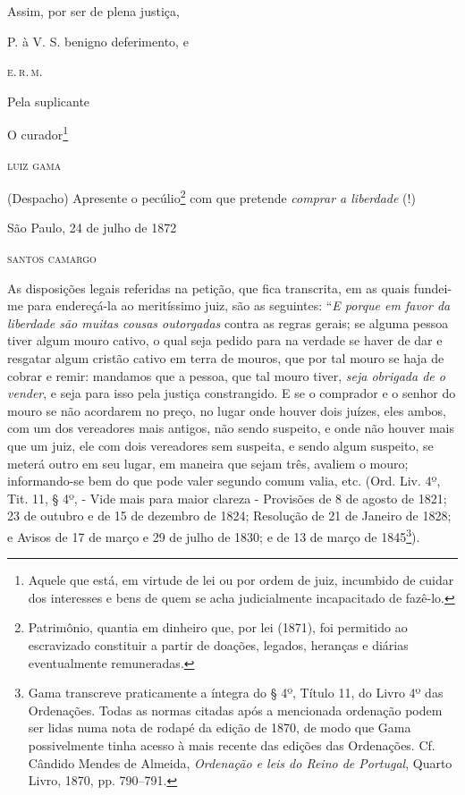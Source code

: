 Assim, por ser de plena justiça,

P. à V. S. benigno deferimento, e

\begin{flushright}
\textsc{e.\,r.\,m.}

Pela suplicante

O curador\footnote{ Aquele que está, em virtude de lei ou por ordem de
  juiz, incumbido de cuidar dos interesses e bens de quem se acha
  judicialmente incapacitado de fazê-lo.}

\textsc{luiz gama}
\end{flushright}

(Despacho) Apresente o pecúlio\footnote{ Patrimônio, quantia em
  dinheiro que, por lei (1871), foi permitido ao escravizado constituir
  a partir de doações, legados, heranças e diárias eventualmente
  remuneradas.} com que pretende \emph{comprar a liberdade} (!)

\begin{flushright}
São Paulo, 24 de julho de 1872

\textsc{santos camargo}
\end{flushright}

As disposições legais referidas na petição, que fica transcrita, em as
quais fundei-me para endereçá-la ao meritíssimo juiz, são as seguintes:
``\emph{E porque em favor da liberdade são muitas cousas outorgadas}
contra as regras gerais; se alguma pessoa tiver algum mouro cativo, o
qual seja pedido para na verdade se haver de dar e resgatar algum
cristão cativo em terra de mouros, que por tal mouro se haja de cobrar e
remir: mandamos que a pessoa, que tal mouro tiver, \emph{seja obrigada
de o vender}, e seja para isso pela justiça constrangido. E se o
comprador e o senhor do mouro se não acordarem no preço, no lugar onde
houver dois juízes, eles ambos, com um dos vereadores mais antigos, não
sendo suspeito, e onde não houver mais que um juiz, ele com dois
vereadores sem suspeita, e sendo algum suspeito, se meterá outro em seu
lugar, em maneira que sejam três, avaliem o mouro; informando-se bem do
que pode valer segundo comum valia, etc. (Ord. Liv. 4º, Tit. 11, § 4º, -
Vide mais para maior clareza - Provisões de 8 de agosto de 1821; 23 de
outubro e de 15 de dezembro de 1824; Resolução de 21 de Janeiro de 1828;
e Avisos de 17 de março e 29 de julho de 1830; e de 13 de março de
1845\footnote{ Gama transcreve praticamente a íntegra do § 4º, Título
  11, do Livro 4º das Ordenações. Todas as normas citadas após a
  mencionada ordenação podem ser lidas numa nota de rodapé da edição de
  1870, de modo que Gama possivelmente tinha acesso à mais recente das
  edições das Ordenações. Cf. Cândido Mendes de Almeida, \emph{Ordenação
  e leis do Reino de Portugal}, Quarto Livro, 1870, pp. 790--791.}).

